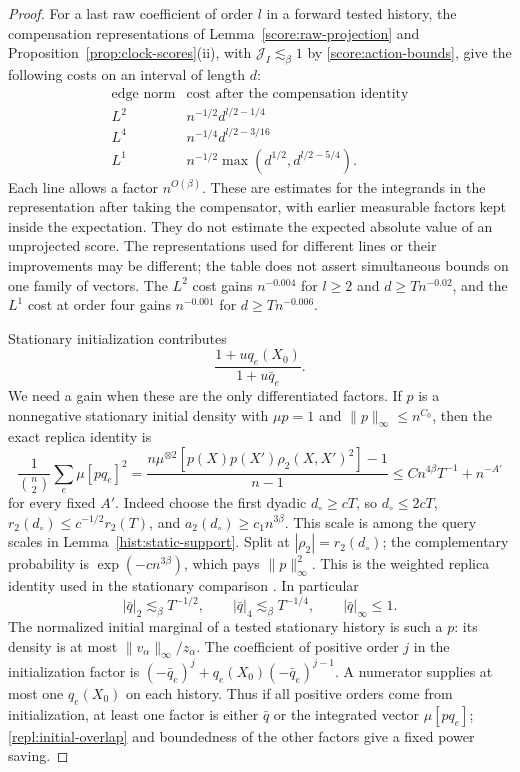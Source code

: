 \begin{proof}
For a last raw coefficient of order $l$ in a forward tested history, the
compensation representations of
Lemma~\ref{score:raw-projection} and Proposition~\ref{prop:clock-scores}(ii), with
$\mathcal J_I\lesssim_\beta1$ by \eqref{score:action-bounds}, give the
following costs on an interval of length
$d$:
\begin{equation}\label{repl:forward-costs}
\begin{array}{c|c}
\text{edge norm}&\text{cost after the compensation identity}\\ \hline
L^2& n^{-1/2}d^{l/2-1/4}\\
L^4& n^{-1/4}d^{l/2-3/16}\\
L^1& n^{-1/2}\max(d^{1/2},d^{l/2-5/4}).
\end{array}
\end{equation}
Each line allows a factor $n^{O(\beta)}$.  These are estimates for the
integrands in the representation after taking the compensator, with earlier
measurable factors kept inside the expectation.  They do not estimate the
expected absolute value of an unprojected score.  The representations used
for different lines or their improvements may be different; the table does
not assert simultaneous bounds on one family of vectors.  The $L^2$ cost gains
$n^{-0.004}$ for $l\ge2$ and $d\ge Tn^{-0.02}$, and the $L^1$ cost at order
four gains $n^{-0.001}$ for $d\ge Tn^{-0.006}$.

Stationary initialization contributes
\[
 \frac{1+u q_e(X_0)}{1+u \bar q_e}.
\]
We need a gain when these are the only differentiated factors.  If $p$ is
a nonnegative stationary initial density with $\mu p=1$ and
$\|p\|_\infty\le n^{C_0}$, then the exact replica identity is
\begin{equation}\label{repl:initial-overlap}
 \frac1{\binom n2}\sum_e \mu[pq_e]^2
 =\frac{n\mu^{\otimes2}[p(X)p(X')\rho_2(X,X')^2]-1}{n-1}
 \le C n^{4\beta}T^{-1}+n^{-A'}
\end{equation}
for every fixed $A'$.  Indeed choose the first dyadic $d_\circ\ge cT$, so
$d_\circ\le2cT$, $r_2(d_\circ)\le c^{-1/2}r_2(T)$, and
$a_2(d_\circ)\ge c_1 n^{3\beta}$.  This scale is among the query scales
in Lemma~\ref{hist:static-support}.  Split at $|\rho_2|=r_2(d_\circ)$;
the complementary probability is
$\exp(-c n^{3\beta})$, which pays $\|p\|_\infty^2$.  This is the weighted
replica identity used in the stationary comparison
\cite[Section~8]{FUA}. %
In particular
\begin{equation}\label{repl:stationary-factor}
 |\bar q|_2\lesssim_\beta T^{-1/2},\qquad
 |\bar q|_4\lesssim_\beta T^{-1/4},\qquad |\bar q|_\infty\le1 .
\end{equation}
The normalized initial marginal of a tested stationary history is such a
$p$: its density is at most $\|v_\alpha\|_\infty/z_\alpha$.  The coefficient
of positive order $j$ in the initialization factor is
$(-\bar q_e)^j+q_e(X_0)(-\bar q_e)^{j-1}$.  A numerator supplies at most one
$q_e(X_0)$ on each history.  Thus if all positive orders come from
initialization, at least one factor is either $\bar q$ or the integrated vector
$\mu[pq_e]$; \eqref{repl:initial-overlap} and boundedness of the other
factors give a fixed power saving.


\end{proof}
